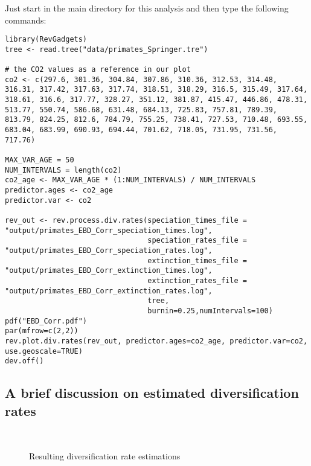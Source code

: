Just start \R in the main directory for this analysis and then type the following commands:
{\tt \begin{snugshade*}
\begin{lstlisting}
library(RevGadgets)
tree <- read.tree("data/primates_Springer.tre")

# the CO2 values as a reference in our plot
co2 <- c(297.6, 301.36, 304.84, 307.86, 310.36, 312.53, 314.48, 316.31, 317.42, 317.63, 317.74, 318.51, 318.29, 316.5, 315.49, 317.64, 318.61, 316.6, 317.77, 328.27, 351.12, 381.87, 415.47, 446.86, 478.31, 513.77, 550.74, 586.68, 631.48, 684.13, 725.83, 757.81, 789.39, 813.79, 824.25, 812.6, 784.79, 755.25, 738.41, 727.53, 710.48, 693.55, 683.04, 683.99, 690.93, 694.44, 701.62, 718.05, 731.95, 731.56, 717.76)

MAX_VAR_AGE = 50
NUM_INTERVALS = length(co2)
co2_age <- MAX_VAR_AGE * (1:NUM_INTERVALS) / NUM_INTERVALS
predictor.ages <- co2_age
predictor.var <- co2

rev_out <- rev.process.div.rates(speciation_times_file = "output/primates_EBD_Corr_speciation_times.log",
                                 speciation_rates_file = "output/primates_EBD_Corr_speciation_rates.log",
                                 extinction_times_file = "output/primates_EBD_Corr_extinction_times.log",
                                 extinction_rates_file = "output/primates_EBD_Corr_extinction_rates.log",
                                 tree,
                                 burnin=0.25,numIntervals=100)
pdf("EBD_Corr.pdf")
par(mfrow=c(2,2))
rev.plot.div.rates(rev_out, predictor.ages=co2_age, predictor.var=co2, use.geoscale=TRUE)
dev.off()
\end{lstlisting}
\end{snugshade*}}



\subsection{A brief discussion on estimated diversification rates}
\begin{figure}
\\
\caption{\small Resulting diversification rate estimations}
\label{fig:EBD_Results}
\end{figure}

